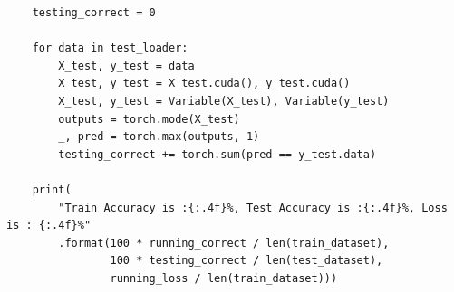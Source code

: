 \documentclass{article}
\begin{document}
\begin{lstlisting}
    testing_correct = 0

    for data in test_loader:
        X_test, y_test = data
        X_test, y_test = X_test.cuda(), y_test.cuda()
        X_test, y_test = Variable(X_test), Variable(y_test)
        outputs = torch.mode(X_test)
        _, pred = torch.max(outputs, 1)
        testing_correct += torch.sum(pred == y_test.data)

    print(
        "Train Accuracy is :{:.4f}%, Test Accuracy is :{:.4f}%, Loss is : {:.4f}%"
        .format(100 * running_correct / len(train_dataset),
                100 * testing_correct / len(test_dataset),
                running_loss / len(train_dataset)))
\end{lstlisting}
\end{document}
